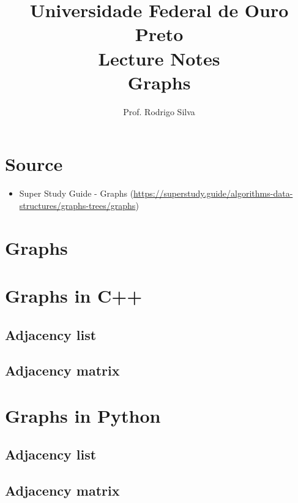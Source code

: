 \documentclass{article}
\title{\vspace{-2 cm}Universidade Federal de Ouro Preto \\ Lecture Notes \\ Graphs}
\author{Prof. Rodrigo Silva}
\begin{document}
\maketitle

\section*{Source}

\begin{itemize}
    \item Super Study Guide - Graphs (\url{https://superstudy.guide/algorithms-data-structures/graphs-trees/graphs})
\end{itemize}

\section{Graphs}



\section{Graphs in C++}

\subsection{Adjacency list}



\subsection{Adjacency matrix}



\section{Graphs in Python}

\subsection{Adjacency list}



\subsection{Adjacency matrix}


\end{document}
